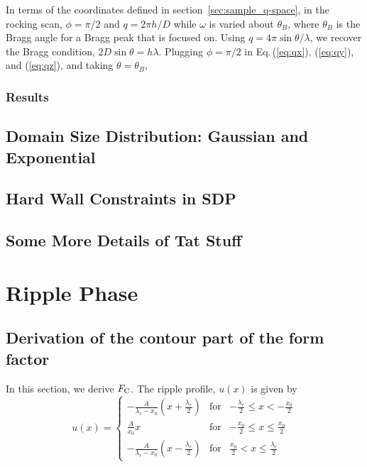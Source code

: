 In terms of the coordinates defined in section~\ref{sec:sample_q-space}, in the rocking scan, $\phi=\pi/2$ and 
$q=2\pi h/D$
while $\omega$ is varied about $\theta_B$, where $\theta_B$ is the Bragg
angle for a Bragg peak that is focused on. Using $q=4\pi\sin\theta/\lambda$, 
we recover the Bragg condition, $2D\sin\theta=h\lambda$. Plugging $\phi=\pi/2$
in Eq.\,(\ref{eq:qx}), (\ref{eq:qy}), and (\ref{eq:qz}), and taking 
$\theta=\theta_B$, 

\subsection{Results}

\section{Domain Size Distribution: Gaussian and Exponential}

\section{Hard Wall Constraints in SDP}

\section{Some More Details of Tat Stuff}

\chapter{Ripple Phase}
\section{Derivation of the contour part of the form factor}
In this section, we derive $F_\mathrm{C}$. The ripple profile, $u(x)$ is given by
\begin{equation}
  u(x) = \left\{
    \begin{array}{ccc}
    -\frac{A}{\lambda_r-x_0}\left(x+\frac{\lambda_r}{2}\right) 
      & \text{for} 
      & -\frac{\lambda_r}{2} \leq x < -\frac{x_0}{2} \\
    \frac{A}{x_0}x 
      & \text{for} 
      & -\frac{x_0}{2} \leq x \leq \frac{x_0}{2} \\
    -\frac{A}{\lambda_r-x_0} \left(x-\frac{\lambda_r}{2}\right)
      & \text{for} 
      & \frac{x_0}{2} < x \leq \frac{\lambda_r}{2}
    \end{array} \right.
\end{equation}

